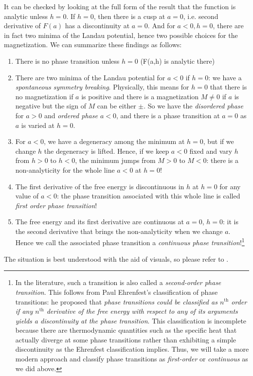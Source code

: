 It can be checked by looking at the full form of the result that the function is analytic unless $h=0$. If $h=0$, then there is a cusp at $a=0$, i.e. second derivative of $F(a)$ has a discontinuity at $a=0$. And for $a<0, h=0$, there are in fact two minima of the Landau potential, hence two possible choices for the magnetization. We can summarize these findings as follows:
\begin{enumerate}
	\item There is no phase transition unless $h=0$ (F(a,h) is analytic there)
	\item There are two minima of the Landau potential for $a<0$ if $h=0$: we have a \emph{spontaneous symmetry breaking}. Physically, this means for $h=0$ that there is no magnetization if $a$ is positive and there is a magnetization $M\ne 0$ if $a$ is negative but the sign of $M$ can be either $\pm$. So we have the \emph{disordered phase} for $a>0$ and \emph{ordered phase $a<0$}, and there is a phase transition at $a=0$ as $a$ is varied at $h=0$.
	\item For $a<0$, we have a degeneracy among the minimum at $h=0$, but if we change $h$ the degeneracy is lifted. Hence, if we keep $a<0$ fixed and vary $h$ from $h>0$ to $h<0$, the minimum jumps from $M>0$ to $M<0$: there is a non-analyticity for the whole line $a<0$ at $h=0$!
	\item The first derivative of the free energy is discontinuous in $h$ at $h=0$ for any value of $a<0$: the phase transition associated with this whole line is called \emph{first order phase transition}!
	
	\item The free energy and its first derivative are continuous at $a=0$, $h=0$: it is the second derivative that brings the non-analyticity when we change $a$. Hence we call the associated phase transition a \emph{continuous phase transition}!\footnote{In the literature, such a transition is also called a \emph{second-order phase transition}. This follows from Paul Ehrenfest's classification of phase transitions: he proposed that \emph{phase transitions could be classified as $n^{\text{th}}$ order if any $n^{\text{th}}$ derivative of the free energy with respect to any of its arguments yields a discontinuity at the phase transition}. This classification is incomplete because there are thermodynamic quantities such as the specific heat that actually diverge at some phase transitions rather than exhibiting a simple discontinuity as the Ehrenfest classification implies. Thus, we will take a more modern approach and classify phase transitions as \emph{first-order} or \emph{continuous} as we did above.}
\end{enumerate}
The situation is best understood with the aid of visuals, so please refer to \figref{\ref{fig: landau potential and phase transitions}}.

